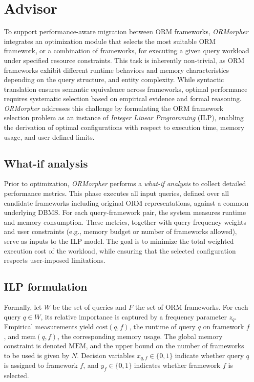 \chapter{Advisor}

To support performance-aware migration between ORM frameworks, \emph{ORMorpher} integrates an optimization module that selects the most suitable ORM framework, or a combination of frameworks, for executing a given query workload under specified resource constraints. This task is inherently non-trivial, as ORM frameworks exhibit different runtime behaviors and memory characteristics depending on the query structure,  and entity complexity. While syntactic translation ensures semantic equivalence across frameworks, optimal performance requires systematic selection based on empirical evidence and formal reasoning. \emph{ORMorpher} addresses this challenge by formulating the ORM framework selection problem as an instance of \emph{Integer Linear Programming} (ILP), enabling the derivation of optimal configurations with respect to execution time, memory usage, and user-defined limits. %

\section{What-if analysis}

Prior to optimization, \emph{ORMorpher} performs a \emph{what-if analysis} to collect detailed performance metrics. This phase executes all input queries, defined over all candidate frameworks including original ORM representations, against a common underlying DBMS. For each query-framework pair, the system measures runtime and memory consumption. These metrics, together with query frequency weights and user constraints (e.g., memory budget or number of frameworks allowed), serve as inputs to the ILP model. The goal is to minimize the total weighted execution cost of the workload, while ensuring that the selected configuration respects user-imposed limitations.

\section{ILP formulation}

Formally, let $W$ be the set of queries and $F$ the set of ORM frameworks. For each query $q \in W$, its relative importance is captured by a frequency parameter $z_q$. Empirical measurements yield $\text{cost}(q, f)$, the runtime of query $q$ on framework $f$, and $\text{mem}(q, f)$, the corresponding memory usage. The global memory constraint is denoted $\text{MEM}$, and the upper bound on the number of frameworks to be used is given by $N$. Decision variables $x_{q,f} \in \{0,1\}$ indicate whether query $q$ is assigned to framework $f$, and $y_f \in \{0,1\}$ indicates whether framework $f$ is selected.

